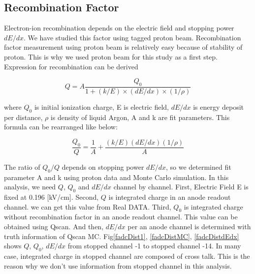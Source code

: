 \subsection{Recombination Factor}
 Electron-ion recombination depends on the electric field and stopping power $dE/dx$. We have studied this factor using tagged proton beam. Recombination factor measurement using proton beam is relatively easy because of stability of proton. This is why we used proton beam for this study as a first step.\\
  Expression for recombination can be derived 

\begin{equation}
  Q = A\frac{Q_{0}}{1+(k/E)\times(dE/dx)\times(1/\rho)}
\end{equation}

where $Q_{0}$ is initial ionization charge, E is electric field, $dE/dx$ is energy deposit per distance, $\rho$ is density of liquid Argon, A and k are fit parameters. This formula can be rearranged like below:

\begin{equation}
  \frac{Q_{0}}{Q} = \frac{1}{A}+\frac{(k/E)(dE/dx)(1/\rho)}{A}
\end{equation}

The ratio of $Q_{0}/Q$ depends on stopping power $dE/dx$, so we determined fit parameter A and k using proton data and Monte Carlo simulation. In this analysis, we need $Q$, $Q_{0}$ and $dE/dx$ channel by channel. First, Electric Field E is fixed at 0.196 [kV/cm]. Second, $Q$ is integrated charge in an anode readout channel. we can get this value from Real DATA. Third, $Q_{0}$ is integrated charge without recombination factor in an anode readout channel. This value can be obtained using Qscan. And then, $dE/dx$ per an anode channel is determined with truth information of Qscan MC. Fig\ref{fadcDist1}, \ref{fadcDistMC}, \ref{fadcDistdEdx} shows $Q$, $Q_{0}$, $dE/dx$ from stopped channel -1 to stopped channel -14. In many case, integrated charge in stopped channel are composed of cross talk. This is the reason why we don't use information from stopped channel in this analysis. 

